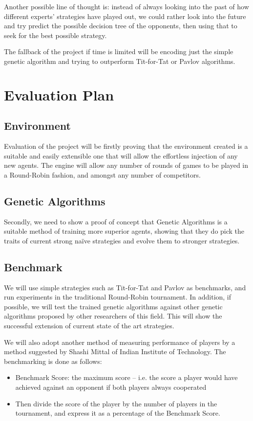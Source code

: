 \documentclass{icldt}
\numberwithin{equation}{section}       %
\begin{document}
Another possible line of thought is: instead of always looking into the past of how different experts' strategies have played out, we could rather look into the future and try predict the possible decision tree of the opponents, then using that to seek for the best possible strategy.

The fallback of the project if time is limited will be encoding just the simple genetic algorithm and trying to outperform Tit-for-Tat or Pavlov algorithms.
\chapter{Evaluation Plan}
\label{ch:Evaluation Plan}
\section{Environment}
\label{sect:Environment}
Evaluation of the project will be firstly proving that the environment created is a suitable and easily extensible one that will allow the effortless injection of any new agents. The engine will allow any number of rounds of games to be played in a Round-Robin fashion, and amongst any number of competitors. 

\section{Genetic Algorithms}
\label{sect:Genetic Algorithms}
Secondly, we need to show a proof of concept that Genetic Algorithms is a suitable method of training more superior agents, showing that they do pick the traits of current strong naïve strategies and evolve them to stronger strategies.

\section{Benchmark}
\label{sect:Benchmark}
We will use simple strategies such as Tit-for-Tat and Pavlov as benchmarks, and run experiments in the traditional Round-Robin tournament. In addition, if possible, we will test the trained genetic algorithms against other genetic algorithms proposed by other researchers of this field. This will show the successful extension of current state of the art strategies.

We will also adopt another method of measuring performance of players by a method suggested by Shashi Mittal of Indian Institute of Technology\cite{shashi}. The benchmarking is done as follows:
\begin{itemize}
\item Benchmark Score: the maximum score – i.e. the score a player would have achieved against an opponent if both players always cooperated
\item Then divide the score of the player by the number of players in the tournament, and express it as a percentage of the Benchmark Score.
\end{itemize}
\end{document}
